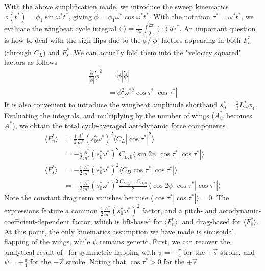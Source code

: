 \documentclass[11pt,letterpaper]{article}
\begin{document}
With the above simplification made, we introduce the
sweep kinematics $\phi(t^*) = \phi_1 \sin \omega^* t^*$,
giving $\dot{\phi} = \phi_1 \omega^* \cos \omega^* t^*$.
With the notation $\tau^* = \omega^* t^*$, we evaluate the
wingbeat cycle integral $\langle\cdot\rangle = \frac{1}{2\pi} \int_0^{2\pi} (\cdot) d\tau^*$.
An important question is how to deal with the sign flips
due to the $\dot{\phi}/|\dot{\phi}|$ factors appearing in both $F_n^*$
(through $C_L$) and $F_s^*$. We can actually fold them
into the "velocity squared" factors as follows
\begin{align}
    \frac{\dot{\phi}}{|\dot\phi|} \dot{\phi}^2 &= \dot{\phi} |\dot{\phi}| \nonumber \\
                                              &= \phi_1^2 \omega^{*2} \cos\tau^* |\cos\tau^*|
\end{align}
It is also convenient to introduce the wingbeat amplitude
shorthand $s_0^* = \frac23 L_w^* \phi_1$. Evaluating the integrals,
and multiplying by the number of wings ($A_w^*$ becomes $A^*$),
we obtain the total cycle-averaged aerodynamic force components
\begin{align}
    \langle F_n^* \rangle &= \frac12 \frac{A^*}{m^*} \left( s_0^* \omega^* \right)^2 \langle C_L |\cos \tau^*|^2 \rangle \nonumber \\
    &= -\frac12 \frac{A^*}{m^*} \left( s_0^* \omega^* \right)^2 C_{L,0} \langle \sin 2\psi\; \cos \tau^* |\cos \tau^*| \rangle \\
    \langle F_s^* \rangle &= -\frac12 \frac{A^*}{m^*} \left( s_0^* \omega^* \right)^2 \langle C_D \cos \tau^* |\cos \tau^*| \rangle \nonumber \\
    &= -\frac12 \frac{A^*}{m^*} \left( s_0^* \omega^* \right)^2 \frac{C_{D,\frac\pi2} - C_{D,0}}{2}\, \langle \cos 2\psi\; \cos \tau^* |\cos \tau^*| \rangle
\end{align}
Note the constant drag term vanishes because $\langle \cos \tau^* |\cos \tau^*| \rangle = 0$.
The expressions feature a common $\frac12 \frac{A^*}{m^*} \left( s_0^* \omega^* \right)^2$
factor, and a pitch- and aerodynamic-coefficient-dependent
factor, which is lift-based for $\langle F_n^* \rangle$,
and drag-based for $\langle F_s^* \rangle$. At this point,
the only kinematics assumption we have made is sinusoidal
flapping of the wings, while $\psi$ remains generic.
First, we can recover the analytical result of~\cite{wetherbee2026}
for symmetric flapping with $\psi = -\frac{\pi}{4}$ for
the $+\vec{s}$ stroke, and $\psi = +\frac{\pi}{4}$ for the
$-\vec{s}$ stroke. Noting that $\cos \tau^* > 0$ for the $+\vec{s}$
\end{document}
